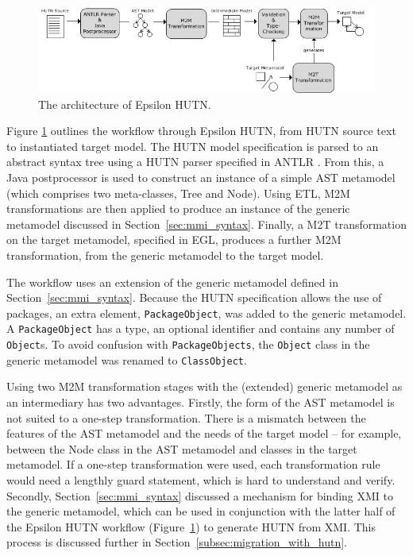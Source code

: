 \begin{figure}[htbp]
  \begin{center}
    \leavevmode
    \includegraphics[scale=0.44]{5.Implementation/hutn_workflow.png}
  \end{center}
  \caption{The architecture of Epsilon HUTN.}
  \label{fig:architecture}
\end{figure}

Figure \ref{fig:architecture} outlines the workflow through Epsilon HUTN, from HUTN source text to instantiated target model. The HUTN model specification is parsed to an abstract syntax tree using a HUTN parser specified in ANTLR \cite{parr07antlr}. From this, a Java postprocessor is used to construct an instance of a simple AST metamodel (which comprises two meta-classes, Tree and Node). Using ETL, M2M transformations are then applied to produce an instance of the generic metamodel discussed in Section~\ref{sec:mmi_syntax}. Finally, a M2T transformation on the target metamodel, specified in EGL, produces a further M2M transformation, from the generic metamodel to the target model.

The workflow uses an extension of the generic metamodel defined in Section~\ref{sec:mmi_syntax}. Because the HUTN specification allows the use of packages, an extra element, \texttt{PackageObject}, was added to the generic metamodel. A \texttt{PackageObject} has a type, an optional identifier and contains any number of \texttt{Object}s. To avoid confusion with \texttt{PackageObjects}, the \texttt{Object} class in the generic metamodel was renamed to \texttt{ClassObject}.

Using two M2M transformation stages with the (extended) generic metamodel as an intermediary has two advantages. Firstly, the form of the AST metamodel is not suited to a one-step transformation. There is a mismatch between the features of the AST metamodel and the needs of the target model -- for example, between the Node class in the AST metamodel and classes in the target metamodel. If a one-step transformation were used, each transformation rule would need a lengthly guard statement, which is hard to understand and verify. Secondly, Section~\ref{sec:mmi_syntax} discussed a mechanism for binding XMI to the generic metamodel, which can be used in conjunction with the latter half of the Epsilon HUTN workflow (Figure~\ref{fig:architecture}) to generate HUTN from XMI. This process is discussed further in Section~\ref{subsec:migration_with_hutn}.

